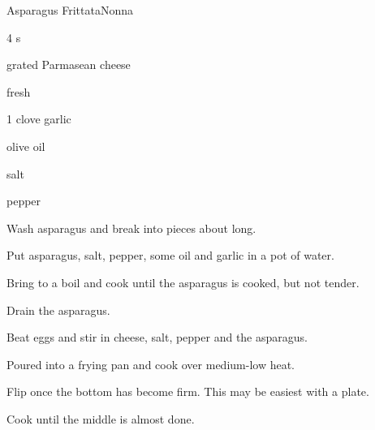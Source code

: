 \begin{recipe}{Asparagus Frittata}{Nonna}{}

\begin{ingredients}
\item 4 s
\item grated Parmasean cheese
\item \C{1 \half} fresh 
\item 1 clove garlic
\item olive oil
\item salt
\item pepper
\end{ingredients}

\begin{directions}
\item Wash asparagus and break into pieces about  long.
\item Put asparagus, salt, pepper, some oil and garlic in a pot of water.
\item Bring to a boil and cook until the asparagus is cooked, but not tender.
\item Drain the asparagus.
\item Beat eggs and stir in cheese, salt, pepper and the asparagus.
\item Poured into a frying pan and cook over medium-low heat.
\item Flip once the bottom has become firm. This may be easiest with a plate.
\item Cook until the middle is almost done.
\end{directions}

\end{recipe}
